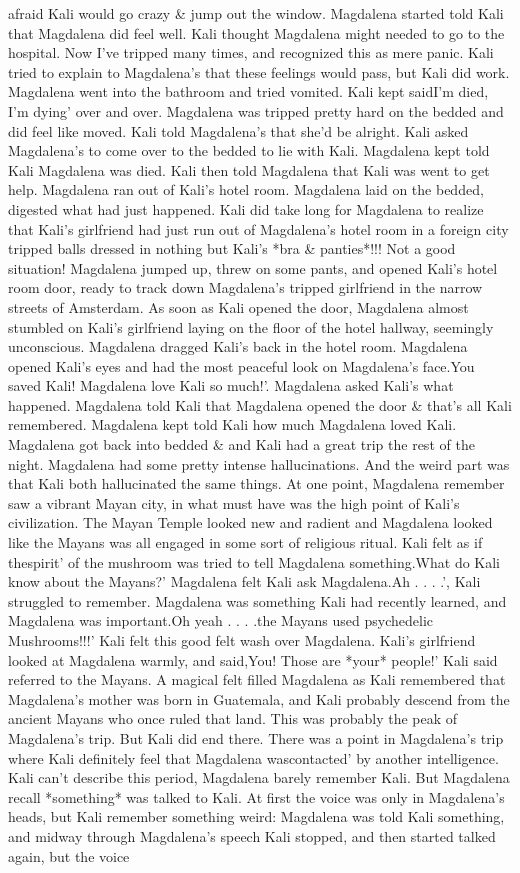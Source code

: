 \documentclass[12pt]{book}
\begin{document}
afraid Kali would go crazy \& jump out the window. Magdalena started told Kali that Magdalena did feel well. Kali thought Magdalena might needed to go to the hospital. Now I've tripped many times, and recognized this as mere panic. Kali tried to explain to Magdalena's that these feelings would pass, but Kali did work. Magdalena went into the bathroom and tried vomited. Kali kept saidI'm died, I'm dying' over and over. Magdalena was tripped pretty hard on the bedded and did feel like moved. Kali told Magdalena's that she'd be alright. Kali asked Magdalena's to come over to the bedded to lie with Kali. Magdalena kept told Kali Magdalena was died. Kali then told Magdalena that Kali was went to get help. Magdalena ran out of Kali's hotel room. Magdalena laid on the bedded, digested what had just happened. Kali did take long for Magdalena to realize that Kali's girlfriend had just run out of Magdalena's hotel room in a foreign city tripped balls dressed in nothing but Kali's *bra \& panties*!!! Not a good situation! Magdalena jumped up, threw on some pants, and opened Kali's hotel room door, ready to track down Magdalena's tripped girlfriend in the narrow streets of Amsterdam. As soon as Kali opened the door, Magdalena almost stumbled on Kali's girlfriend laying on the floor of the hotel hallway, seemingly unconscious. Magdalena dragged Kali's back in the hotel room. Magdalena opened Kali's eyes and had the most peaceful look on Magdalena's face.You saved Kali! Magdalena love Kali so much!'. Magdalena asked Kali's what happened. Magdalena told Kali that Magdalena opened the door \& that's all Kali remembered. Magdalena kept told Kali how much Magdalena loved Kali. Magdalena got back into bedded \& and Kali had a great trip the rest of the night. Magdalena had some pretty intense hallucinations. And the weird part was that Kali both hallucinated the same things. At one point, Magdalena remember saw a vibrant Mayan city, in what must have was the high point of Kali's civilization. The Mayan Temple looked new and radient and Magdalena looked like the Mayans was all engaged in some sort of religious ritual. Kali felt as if thespirit' of the mushroom was tried to tell Magdalena something.What do Kali know about the Mayans?' Magdalena felt Kali ask Magdalena.Ah . . .  .', Kali struggled to remember. Magdalena was something Kali had recently learned, and Magdalena was important.Oh yeah . . .  .the Mayans used psychedelic Mushrooms!!!' Kali felt this good felt wash over Magdalena. Kali's girlfriend looked at Magdalena warmly, and said,You! Those are *your* people!' Kali said referred to the Mayans. A magical felt filled Magdalena as Kali remembered that Magdalena's mother was born in Guatemala, and Kali probably descend from the ancient Mayans who once ruled that land. This was probably the peak of Magdalena's trip. But Kali did end there. There was a point in Magdalena's trip where Kali definitely feel that Magdalena wascontacted' by another intelligence. Kali can't describe this period, Magdalena barely remember Kali. But Magdalena recall *something* was talked to Kali. At first the voice was only in Magdalena's heads, but Kali remember something weird: Magdalena was told Kali something, and midway through Magdalena's speech Kali stopped, and then started talked again, but the voice 
\end{document}
